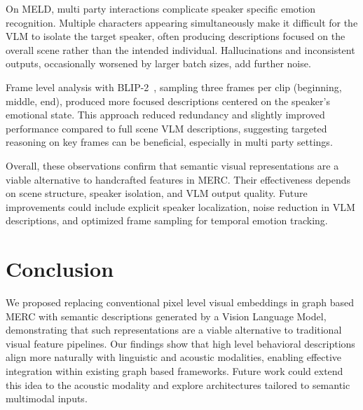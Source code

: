 \documentclass[runningheads]{llncs}
\begin{document}
On MELD, multi party interactions complicate speaker specific emotion recognition. Multiple characters appearing simultaneously make it difficult for the VLM to isolate the target speaker, often producing descriptions focused on the overall scene rather than the intended individual. Hallucinations and inconsistent outputs, occasionally worsened by larger batch sizes, add further noise.

Frame level analysis with BLIP-2~\cite{li2023blip2}, sampling three frames per clip (beginning, middle, end), produced more focused descriptions centered on the speaker's emotional state. This approach reduced redundancy and slightly improved performance compared to full scene VLM descriptions, suggesting targeted reasoning on key frames can be beneficial, especially in multi party settings.

Overall, these observations confirm that semantic visual representations are a viable alternative to handcrafted features in MERC. Their effectiveness depends on scene structure, speaker isolation, and VLM output quality. Future improvements could include explicit speaker localization, noise reduction in VLM descriptions, and optimized frame sampling for temporal emotion tracking.

\section{Conclusion}

We proposed replacing conventional pixel level visual embeddings in graph based MERC with semantic descriptions generated by a Vision Language Model, demonstrating that such representations are a viable alternative to traditional visual feature pipelines. Our findings show that high level behavioral descriptions align more naturally with linguistic and acoustic modalities, enabling effective integration within existing graph based frameworks. Future work could extend this idea to the acoustic modality and explore architectures tailored to semantic multimodal inputs.


%
%


\end{document}
